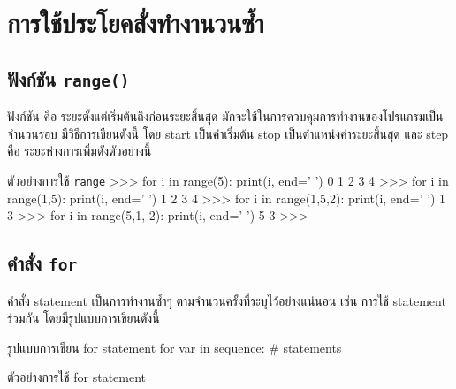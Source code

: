 \chapter{การใช้ประโยคสั่งทำงานวนซ้ำ}
\section{ฟังก์ชัน \texttt{range()}}

ฟังก์ชัน   คือ ระยะตั้งแต่เริ่มต้นถึงก่อนระยะสิ้นสุด มักจะใช้ในการควบคุมการทำงานของโปรแกรมเป็นจำนวนรอบ มีวิธีการเขียนดังนี้   โดย start เป็นค่าเริ่มต้น stop เป็นตำแหน่งค่าระยะสิ้นสุด และ step คือ ระยะห่างการเพิ่มดังตัวอย่างนี้


\begin{codelist}{ตัวอย่างการใช้ \texttt{range}}{}
>>> for i in range(5): print(i, end=' ')
0 1 2 3 4 
>>> for i in range(1,5): print(i, end=' ')
1 2 3 4 
>>> for i in range(1,5,2): print(i, end=' ')
1 3 
>>> for i in range(5,1,-2): print(i, end=' ')
5 3 
>>> 
\end{codelist}

\section{คำสั่ง \texttt{for}}

คำสั่ง   statement เป็นการทำงานซ้ำๆ ตามจำนวนครั้งที่ระบุไว้อย่างแน่นอน เช่น การใช้   statement ร่วมกัน   โดยมีรูปแบบการเขียนดังนี้


\begin{codelist}{รูปแบบการเขียน for statement}{}
for var in sequence:
    # statements
\end{codelist}

ตัวอย่างการใช้ for statement


